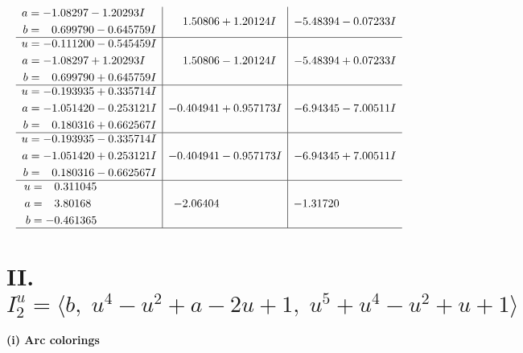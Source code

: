 \documentclass[1p]{elsarticle_modified}
\theoremstyle{definition}
\begin{document}
$$\begin{array}{c|c|c}
\begin{aligned}
a &= -1.08297 - 1.20293 I \\
b &= \phantom{-}0.699790 - 0.645759 I\end{aligned}
 & \phantom{-}1.50806 + 1.20124 I & -5.48394 - 0.07233 I \\ \hline\begin{aligned}
u &= -0.111200 - 0.545459 I \\
a &= -1.08297 + 1.20293 I \\
b &= \phantom{-}0.699790 + 0.645759 I\end{aligned}
 & \phantom{-}1.50806 - 1.20124 I & -5.48394 + 0.07233 I \\ \hline\begin{aligned}
u &= -0.193935 + 0.335714 I \\
a &= -1.051420 - 0.253121 I \\
b &= \phantom{-}0.180316 + 0.662567 I\end{aligned}
 & -0.404941 + 0.957173 I & -6.94345 - 7.00511 I \\ \hline\begin{aligned}
u &= -0.193935 - 0.335714 I \\
a &= -1.051420 + 0.253121 I \\
b &= \phantom{-}0.180316 - 0.662567 I\end{aligned}
 & -0.404941 - 0.957173 I & -6.94345 + 7.00511 I \\ \hline\begin{aligned}
u &= \phantom{-}0.311045\phantom{ +0.000000I} \\
a &= \phantom{-}3.80168\phantom{ +0.000000I} \\
b &= -0.461365\phantom{ +0.000000I}\end{aligned}
 & -2.06404\phantom{ +0.000000I} & -1.31720\phantom{ +0.000000I}\\
 \hline 
 \end{array}$$\newpage\newpage\renewcommand{\arraystretch}{1}
\centering \section*{II. $I^u_{2}= \langle b,\;u^4- u^2+a-2 u+1,\;u^5+u^4- u^2+u+1 \rangle$}
\flushleft \textbf{(i) Arc colorings}\\
\end{document}
